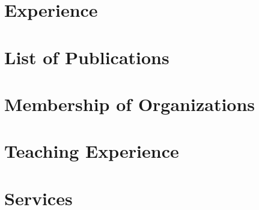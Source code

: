 \documentclass[]{res}
\begin{document}
\begin{resume}
\section{Experience}
\vspace*{0.2in} 
 


%


\section{List of Publications}
\vspace*{0.2in}


\section{Membership of Organizations}
\vspace*{0.2in}


\section{Teaching Experience}
\vspace*{0.2in}


\section{Services}
\vspace*{0.2in}

\end{resume}
\end{document}
